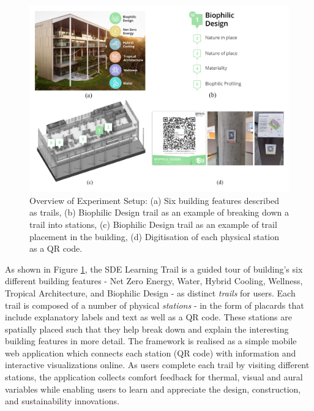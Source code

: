 
\begin{figure}
\begin{center}
\includegraphics[width=\textwidth, trim= 0cm 0cm 0cm 0cm,clip]{Images/Fig1.jpg}
\caption{Overview of Experiment Setup: (a) Six building features described as trails, (b) Biophilic Design trail as an example of breaking down a trail into stations, (c) Biophilic Design trail as an example of trail placement in the building, (d) Digitisation of each physical station as a QR code.}
\label{fig:framework}
\end{center}
\end{figure}  

As shown in Figure \ref{fig:framework}, the SDE Learning Trail is a guided tour of building's six different building features - Net Zero Energy, Water, Hybrid Cooling, Wellness, Tropical Architecture, and Biophilic Design - as distinct \emph{trails} for users. Each trail is composed of a number of physical \emph{stations} - in the form of placards that include explanatory labels and text as well as a QR code. These stations are spatially placed such that they help break down and explain the interesting building features in more detail. The framework is realised as a simple mobile web application which connects each station (QR code) with information and interactive visualizations online. As users complete each trail by visiting different stations, the application collects comfort feedback for thermal, visual and aural variables while enabling users to learn and appreciate the design, construction, and sustainability innovations.

